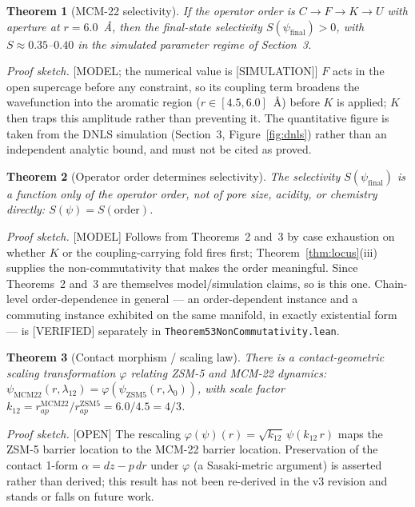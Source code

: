 \documentclass[11pt]{article}
\newtheorem{theorem}{Theorem}
\begin{document}
\begin{theorem}[MCM-22 selectivity]
If the operator order is $C \to F \to K \to U$ with aperture at $r=6.0$~\AA, then the final-state selectivity $S(\psi_{\mathrm{final}}) > 0$, with $S \approx 0.35$--$0.40$ in the simulated parameter regime of Section~3.
\end{theorem}
\emph{Proof sketch.} \textnormal{[MODEL; the numerical value is [SIMULATION]]} $F$ acts in the open supercage before any constraint, so its coupling term broadens the wavefunction into the aromatic region ($r\in[4.5,6.0]$~\AA) before $K$ is applied; $K$ then traps this amplitude rather than preventing it. The quantitative figure is taken from the DNLS simulation (Section~3, Figure~\ref{fig:dnls}) rather than an independent analytic bound, and must not be cited as proved.

\begin{theorem}[Operator order determines selectivity]
The selectivity $S(\psi_{\mathrm{final}})$ is a function only of the operator order, not of pore size, acidity, or chemistry directly: $S(\psi) = S(\mathrm{order})$.
\end{theorem}
\emph{Proof sketch.} \textnormal{[MODEL]} Follows from Theorems~2 and~3 by case exhaustion on whether $K$ or the coupling-carrying fold fires first; Theorem~\ref{thm:locus}(iii) supplies the non-commutativity that makes the order meaningful. Since Theorems~2 and~3 are themselves model/simulation claims, so is this one. Chain-level order-dependence in general --- an order-dependent instance and a commuting instance exhibited on the same manifold, in exactly existential form --- is \textnormal{[VERIFIED]} separately in \texttt{Theorem53NonCommutativity.lean}.

\begin{theorem}[Contact morphism / scaling law]
There is a contact-geometric scaling transformation $\varphi$ relating ZSM-5 and MCM-22 dynamics: $\psi_{\mathrm{MCM22}}(r,\lambda_{12}) = \varphi(\psi_{\mathrm{ZSM5}}(r,\lambda_0))$, with scale factor $k_{12} = r_{ap}^{\mathrm{MCM22}}/r_{ap}^{\mathrm{ZSM5}} = 6.0/4.5 = 4/3$.
\end{theorem}
\emph{Proof sketch.} \textnormal{[OPEN]} The rescaling $\varphi(\psi)(r) = \sqrt{k_{12}}\,\psi(k_{12}\,r)$ maps the ZSM-5 barrier location to the MCM-22 barrier location. Preservation of the contact 1-form $\alpha = dz - p\,dr$ under $\varphi$ (a Sasaki-metric argument) is asserted rather than derived; this result has not been re-derived in the v3 revision and stands or falls on future work.
\end{document}
